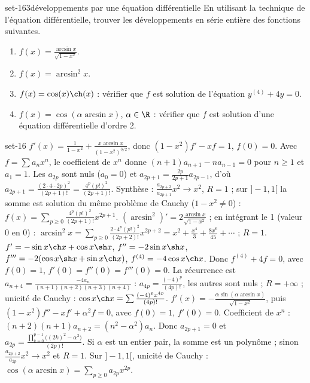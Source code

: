 \begin{exo}{set-16}{3}{développements par une équation différentielle}
En utilisant la technique de l'équation différentielle, trouver les développements en série entière des fonctions suivantes.
\begin{enumerate}
\item $f(x)=\frac{\arcsin x}{\sqrt{1-x^2}}$.
\item $f(x)=\arcsin^2x$.
\item $f(x)=\cos(x)\ch(x)$ : vérifier que $f$ est solution de l'équation $y^{(4)}+4y=0$.
\item $f(x)=\cos(\alpha\arcsin x)$, $\alpha\in\R$ : vérifier que $f$ est solution d'une équation différentielle d'ordre 2.
\end{enumerate}
\end{exo}

\begin{corrige}{set-16}
 $f'(x)=\frac1{1-x^2}+\frac{x\arcsin x}{(1-x^2)^{3/2}}$, donc $(1-x^2)f'-xf=1$, $f(0)=0$. Avec $f=\sum a_nx^n$, le coefficient de $x^n$ donne
$(n+1)a_{n+1}-na_{n-1}=0$ pour $n\geq1$ et $a_1=1$. Les $a_{2p}$ sont nuls ($a_0=0$) et $a_{2p+1}=\frac{2p}{2p+1}a_{2p-1}$, d'où
$a_{2p+1}=\frac{(2\cdot4\cdots2p)^2}{(2p+1)!}=\frac{4^p(p!)^2}{(2p+1)!}$. Synthèse : $\frac{a_{2p+3}}{a_{2p+1}}x^2\to x^2$, $R=1$ ; sur $]-1,1[$ la somme est solution
du même problème de Cauchy ($1-x^2\neq0$) : $f(x)=\sum_{p\geq0}\frac{4^p(p!)^2}{(2p+1)!}x^{2p+1}$.
 $(\arcsin^2)'=2\frac{\arcsin x}{\sqrt{1-x^2}}$ ; en intégrant le 1 (valeur $0$ en $0$) :
$\arcsin^2x=\sum_{p\geq0}\frac{2\cdot4^p(p!)^2}{(2p+2)!}x^{2p+2}=x^2+\frac{x^4}3+\frac{8x^6}{45}+\cdots$ ; $R=1$.
 $f'=-\sin x\ch x+\cos x\sh x$, $f''=-2\sin x\sh x$, $f'''=-2(\cos x\sh x+\sin x\ch x)$,
$f^{(4)}=-4\cos x\ch x$. Donc $f^{(4)}+4f=0$, avec $f(0)=1$, $f'(0)=f''(0)=f'''(0)=0$. La récurrence est $a_{n+4}=\frac{-4a_n}{(n+1)(n+2)(n+3)(n+4)}$ :
$a_{4p}=\frac{(-4)^p}{(4p)!}$, les autres sont nuls ; $R=+\infty$ ; unicité de Cauchy : $\cos x\ch x=\sum\frac{(-4)^px^{4p}}{(4p)!}$.
 $f'(x)=-\frac{\alpha\sin(\alpha\arcsin x)}{\sqrt{1-x^2}}$, puis $(1-x^2)f''-xf'+\alpha^2f=0$, avec $f(0)=1$, $f'(0)=0$. Coefficient de $x^n$ :
$(n+2)(n+1)a_{n+2}=(n^2-\alpha^2)a_n$. Donc $a_{2p+1}=0$ et $a_{2p}=\frac{\prod_{k=0}^{p-1}\big((2k)^2-\alpha^2\big)}{(2p)!}$. Si $\alpha$ est un entier pair, la somme
est un polynôme ; sinon $\frac{a_{2p+2}}{a_{2p}}x^2\to x^2$ et $R=1$. Sur $]-1,1[$, unicité de Cauchy : $\cos(\alpha\arcsin x)=\sum_{p\geq0}a_{2p}x^{2p}$.
\end{corrige}


